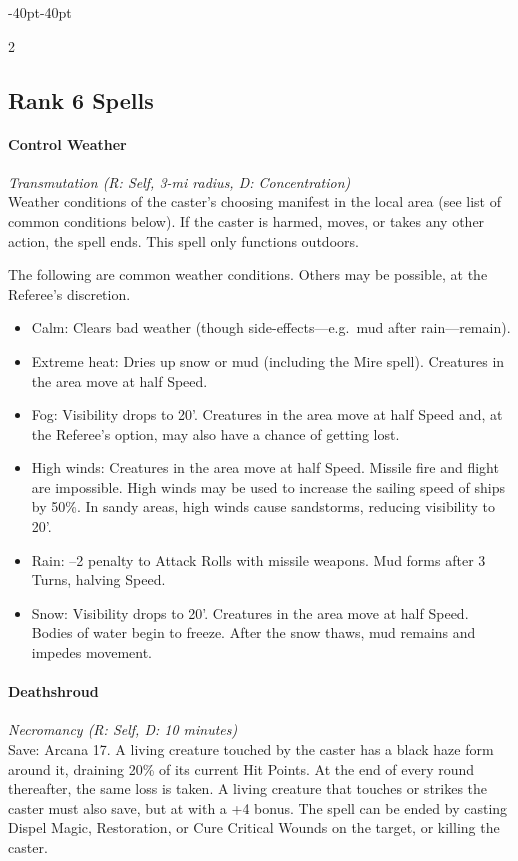 \documentclass{book}
\providecommand{\tightlist}{%
\setlength{\itemsep}{0pt}\setlength{\parskip}{0pt}}
\begin{document}
\begin{adjustwidth}{-40pt}{-40pt}
\begin{multicols}{2}
\subsection*{Rank 6 Spells}\label{rank-6-spells}

\paragraph{Control Weather}\label{control-weather}

\emph{Transmutation (R: Self, 3-mi radius, D: Concentration)}\\
Weather conditions of the caster's choosing manifest in the local area
(see list of common conditions below). If the caster is harmed, moves,
or takes any other action, the spell ends. This spell only functions
outdoors.

The following are common weather conditions. Others may be possible, at
the Referee's discretion.

\begin{itemize}
	\tightlist
	\item
	Calm: Clears bad weather (though side-effects---e.g.~mud after
	rain---remain).
	\item
	Extreme heat: Dries up snow or mud (including the Mire spell).
	Creatures in the area move at half Speed.
	\item
	Fog: Visibility drops to 20'. Creatures in the area move at half Speed
	and, at the Referee's option, may also have a chance of getting lost.
	\item
	High winds: Creatures in the area move at half Speed. Missile fire and
	flight are impossible. High winds may be used to increase the sailing
	speed of ships by 50\%. In sandy areas, high winds cause sandstorms,
	reducing visibility to 20'.
	\item
	Rain: --2 penalty to Attack Rolls with missile weapons. Mud forms
	after 3 Turns, halving Speed.
	\item
	Snow: Visibility drops to 20'. Creatures in the area move at half
	Speed. Bodies of water begin to freeze. After the snow thaws, mud
	remains and impedes movement.
\end{itemize}

\paragraph{Deathshroud}\label{deathshroud}

\emph{Necromancy (R: Self, D: 10 minutes)}\\
Save: Arcana 17. A living creature touched by the caster has a black
haze form around it, draining 20\% of its current Hit Points. At the end
of every round thereafter, the same loss is taken. A living creature
that touches or strikes the caster must also save, but at with a +4
bonus. The spell can be ended by casting Dispel Magic, Restoration, or
Cure Critical Wounds on the target, or killing the caster.


\end{multicols}
\end{adjustwidth}
\end{document}
